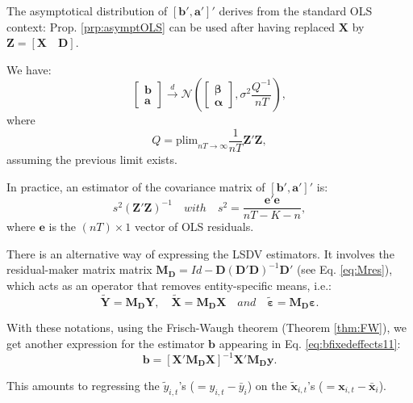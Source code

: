 \documentclass[
  12pt,
]{book}
\theoremstyle{definition}
\theoremstyle{definition}
\theoremstyle{definition}
\theoremstyle{definition}
\theoremstyle{remark}
\begin{document}
The asymptotical distribution of \([\mathbf{b}',\mathbf{a}']'\) derives from the standard OLS context: Prop. \ref{prp:asymptOLS} can be used after having replaced \(\mathbf{X}\) by \(\mathbf{Z}=[\mathbf{X} \quad \mathbf{D}]\).

We have:
\begin{equation}
\boxed{\left[
\begin{array}{c}
\mathbf{b}\\
\mathbf{a}
\end{array}
\right] \overset{d}{\rightarrow}
\mathcal{N}\left(
\left[
\begin{array}{c}
\boldsymbol\beta\\
\boldsymbol\alpha
\end{array}
\right],
\sigma^2 \frac{Q^{-1}}{nT}
\right),}
\end{equation}
where
\[
Q = \mbox{plim}_{nT \rightarrow \infty} \frac{1}{nT} \mathbf{Z}'\mathbf{Z},
\]
assuming the previous limit exists.

In practice, an estimator of the covariance matrix of \([\mathbf{b}',\mathbf{a}']'\) is:
\[
s^2 \left( \mathbf{Z}'\mathbf{Z}\right)^{-1} \quad with \quad s^2 = \frac{\mathbf{e}'\mathbf{e}}{nT - K - n},
\]
where \(\mathbf{e}\) is the \((nT) \times 1\) vector of OLS residuals.

There is an alternative way of expressing the LSDV estimators. It involves the residual-maker matrix matrix \(\mathbf{M_D}=Id - \mathbf{D}(\mathbf{D}'\mathbf{D})^{-1}\mathbf{D}'\) (see Eq. \eqref{eq:Mres}), which acts as an operator that removes entity-specific means, i.e.:
\[
\tilde{\mathbf{Y}} = \mathbf{M_D}\mathbf{Y}, \quad \tilde{\mathbf{X}} = \mathbf{M_D}\mathbf{X} \quad and \quad \tilde{\boldsymbol\varepsilon} = \mathbf{M_D}\boldsymbol\varepsilon.
\]

With these notations, using the Frisch-Waugh theorem (Theorem \ref{thm:FW}), we get another expression for the estimator \(\mathbf{b}\) appearing in Eq. \eqref{eq:bfixedeffects11}:
\begin{equation}
\boxed{\mathbf{b} = [\mathbf{X}'\mathbf{M_D}\mathbf{X}]^{-1}\mathbf{X}'\mathbf{M_D}\mathbf{y}.}\label{eq:bfixedeffects}
\end{equation}

This amounts to regressing the \(\tilde{y}_{i,t}\)'s (\(= y_{i,t} - \bar{y}_i\)) on the \(\tilde{\mathbf{x}}_{i,t}\)'s (\(=\mathbf{x}_{i,t} - \bar{\mathbf{x}}_i\)).
\end{document}
